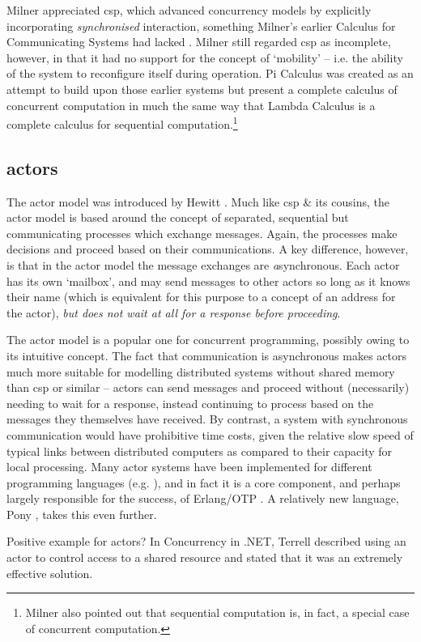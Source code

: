 Milner appreciated \gls{csp}, which advanced concurrency models by explicitly incorporating \emph{synchronised} interaction, something Milner's earlier Calculus for Communicating Systems \cite{Milner1980} had lacked  \cite{Milner1993}.  Milner still regarded \gls{csp} as incomplete, however, in that it had no support for the concept of `mobility' -- i.e. the ability of the system to reconfigure itself during operation.  Pi Calculus was created as an attempt to build upon those earlier systems but present a complete calculus of concurrent computation in much the same way that Lambda Calculus \cite{Barendregt1984} is a complete calculus for sequential computation.\footnote{Milner also pointed out that sequential computation is, in fact, a special case of concurrent computation.}

\subsection{\label{subsec:actors}\texorpdfstring{\Glspl{actor}}{Actors}}
The \gls{actor} \cite{Agha1986} model was introduced by Hewitt \cite{Hewitt1973}.  Much like \gls{csp} \& its cousins, the \gls{actor} model is based around the concept of separated, sequential but communicating processes which exchange messages.  Again, the processes make decisions and proceed based on their communications.  A key difference, however, is that in the \gls{actor} model the message exchanges are \emph{a}synchronous.  Each \gls{actor} has its own `mailbox', and may send messages to other \glspl{actor} so long as it knows their name (which is equivalent for this purpose to a concept of an address for the \gls{actor}), \emph{but does not wait at all for a response before proceeding}.

The \gls{actor} model is a popular one for concurrent programming, possibly owing to its intuitive concept.  The fact that communication is asynchronous makes \glspl{actor} much more suitable for modelling distributed systems without shared memory than \gls{csp} or similar -- \glspl{actor} can send messages and proceed without (necessarily) needing to wait for a response, instead continuing to process based on the messages they themselves have received.  By contrast, a system with synchronous communication would have prohibitive time costs, given the relative slow speed of typical links between distributed computers as compared to their capacity for local processing.  Many \gls{actor} systems have been implemented for different programming languages (e.g. \cite{Varela2001,Srinivasan2008,Charousset2016,Bernstein2016} ), and in fact it is a core component, and perhaps largely responsible for the success, of Erlang/OTP \cite{Armstrong2010,Armstrong2013,Vinoski2012}.  A relatively new language, Pony \cite{Clebsch2015,Clebsch2017}, takes this even further.
\begin{anfxnote}{Positive example for actors?}
In Concurrency in .NET, Terrell described using an actor to control access to a shared resource and stated that it was an extremely effective solution.
\end{anfxnote}

